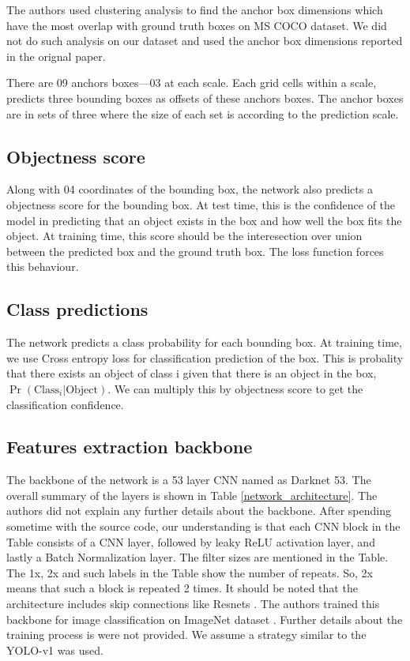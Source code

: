 \documentclass[10pt,twocolumn,letterpaper]{article}
\begin{document}
The authors used clustering analysis to find the anchor box dimensions which have the most overlap with ground truth boxes on MS COCO dataset. We did not do such analysis on our dataset and used the anchor box dimensions reported in the orignal paper.

There are 09 anchors boxes---03 at each scale. Each grid cells within a scale, predicts three bounding boxes as offsets of these anchors boxes. The anchor boxes are in sets of three where the size of each set is according to the prediction scale.

\subsection{Objectness score}
Along with 04 coordinates of the bounding box, the network also predicts a objectness score for the bounding box. At test time, this is the confidence of the model in predicting that an object exists in the box and how well the box fits the object. At training time, this score should be the interesection over union between the predicted box and the ground truth box. The loss function forces this behaviour.

\subsection{Class predictions}
The network predicts a class probability for each bounding box. At training time, we use Cross entropy loss for classification prediction of the box. This is probality that there exists an object of class i given that there is an object in the box, $\Pr(\textrm{Class}_i | \textrm{Object})$. We can multiply this by objectness score to get the classification confidence.

\subsection{Features extraction backbone}
The backbone of the network is a 53 layer CNN named as Darknet 53. The overall summary of the layers is shown in Table \ref{network_architecture}. The authors did not explain any further details about the backbone. After spending sometime with the source code, our understanding is that each CNN block in the Table consists of a CNN layer, followed by leaky ReLU activation layer, and lastly a Batch Normalization layer. The filter sizes are mentioned in the Table. The 1x, 2x and such labels in the Table show the number of repeats. So, 2x means that such a block is repeated 2 times. It should be noted that the architecture includes skip connections like Resnets \cite{Resnets}. The authors trained this backbone for image classification on ImageNet dataset \cite{imagenet_dataset}. Further details about the training process is were not provided. We assume a strategy similar to the YOLO-v1 was used.
\end{document}
